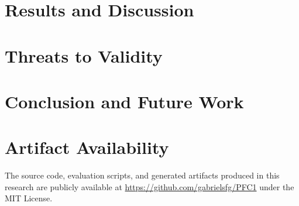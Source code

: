 \documentclass[sigconf]{acmart}
\begin{document}

\section{Results and Discussion}
\label{sec:results}


\section{Threats to Validity}
\label{sec:threats}


\section{Conclusion and Future Work}
\label{sec:conclusion}


\section*{Artifact Availability}

The source code, evaluation scripts, and generated artifacts produced
in this research are publicly available at
\url{https://github.com/gabrielsfg/PFC1} under the MIT License.



\end{document}
